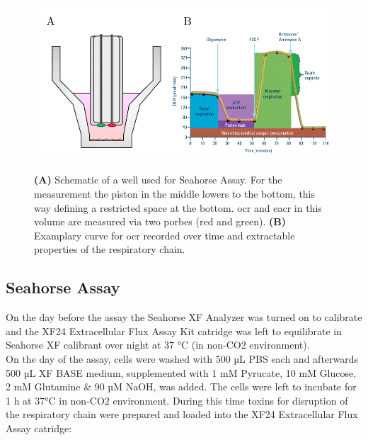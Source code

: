 \begin{figure}[h]
\capstart
    \centering
    \includegraphics{Abbildung/seahorse_basics_placeholder.pdf}

    \begin{minipage}{\captionwidth}
        \caption[enrichment]{\\
        \textbf{(A)} Schematic of a well used for Seahorse Assay. For the measurement the piston in the middle lowers to the bottom, this way defining a restricted space at the bottom. \ac{ocr} and \ac{eacr} in this volume are measured via two porbes (red and green). \textbf{(B)} Examplary curve for \ac{ocr} recorded over time and extractable properties of the respiratory chain.}
        \label{fig:seahorse_basics}
    \end{minipage}
\end{figure}


    \subsection{Seahorse Assay}
    On the day before the assay the Seahorse XF Analyzer was turned on to calibrate and the XF24 Extracellular Flux Assay Kit catridge was left to equilibrate in Seahorse XF calibrant over night at 37 °C (in non-CO2 environment).\\
    On the day of the assay, cells were washed with 500 µL PBS each and afterwards 500 µL XF BASE medium, supplemented with 1 mM Pyrucate, 10 mM Glucose, 2 mM Glutamine \& 90 µM NaOH, was added. The cells were left to incubate for 1 h at 37°C in non-CO2 environment. During this time toxins for disruption of the respiratory chain were prepared and loaded into the XF24 Extracellular Flux Assay catridge:


